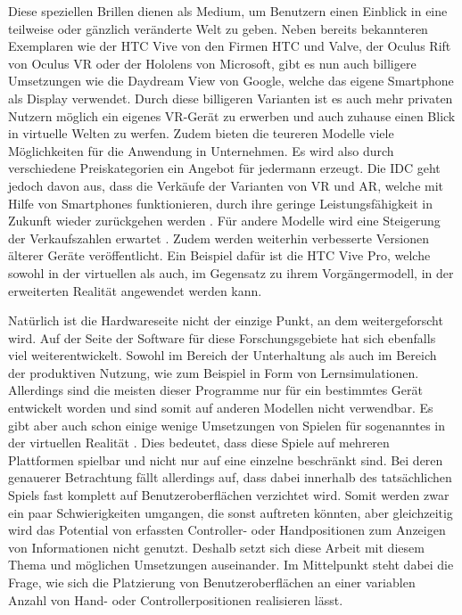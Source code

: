 	Diese speziellen Brillen dienen als Medium, um Benutzern einen Einblick in eine teilweise oder gänzlich veränderte Welt zu geben.
	Neben bereits bekannteren Exemplaren wie der HTC Vive von den Firmen HTC und Valve, der Oculus Rift von Oculus VR oder der Hololens von Microsoft, gibt es nun auch billigere Umsetzungen wie die Daydream View von Google, welche das eigene Smartphone als Display verwendet.
	Durch diese billigeren Varianten ist es auch mehr privaten Nutzern möglich ein eigenes VR-Gerät zu erwerben und auch zuhause einen Blick in virtuelle Welten zu werfen. Zudem bieten die teureren Modelle viele Möglichkeiten für die Anwendung in Unternehmen. Es wird also durch verschiedene Preiskategorien ein Angebot für jedermann erzeugt.
	Die IDC geht jedoch davon aus, dass die Verkäufe der Varianten von VR und AR, welche mit Hilfe von Smartphones funktionieren, durch ihre geringe Leistungsfähigkeit in Zukunft wieder zurückgehen werden \cite{verkauf2}. Für andere Modelle wird eine Steigerung der Verkaufszahlen erwartet \cite{verkaufVR}\cite{verkauf2}.
	Zudem werden weiterhin verbesserte Versionen älterer Geräte veröffentlicht. Ein Beispiel dafür ist die HTC Vive Pro, welche sowohl in der virtuellen als auch, im Gegensatz zu ihrem Vorgängermodell, in der erweiterten Realität angewendet werden kann.

	Natürlich ist die Hardwareseite nicht der einzige Punkt, an dem weitergeforscht wird. Auf der Seite der Software für diese Forschungsgebiete hat sich ebenfalls viel weiterentwickelt. Sowohl im Bereich der Unterhaltung als auch im Bereich der produktiven Nutzung, wie zum Beispiel in Form von Lernsimulationen. Allerdings sind die meisten dieser Programme nur für ein bestimmtes Gerät entwickelt worden und sind somit auf anderen Modellen nicht verwendbar. Es gibt aber auch schon einige wenige Umsetzungen von Spielen für sogenanntes  in der virtuellen Realität \cite{crossCB}. Dies bedeutet, dass diese Spiele auf mehreren Plattformen spielbar und nicht nur auf eine einzelne beschränkt sind. Bei deren genauerer Betrachtung fällt allerdings auf, dass dabei innerhalb des tatsächlichen Spiels fast komplett auf Benutzeroberflächen verzichtet wird. Somit werden zwar ein paar Schwierigkeiten umgangen, die sonst auftreten könnten, aber gleichzeitig wird das Potential von erfassten Controller- oder Handpositionen zum Anzeigen von Informationen nicht genutzt. Deshalb setzt sich diese Arbeit mit diesem Thema und möglichen Umsetzungen auseinander. Im Mittelpunkt steht dabei die Frage, wie sich die Platzierung von Benutzeroberflächen an einer variablen Anzahl von Hand- oder Controllerpositionen realisieren lässt.
	
